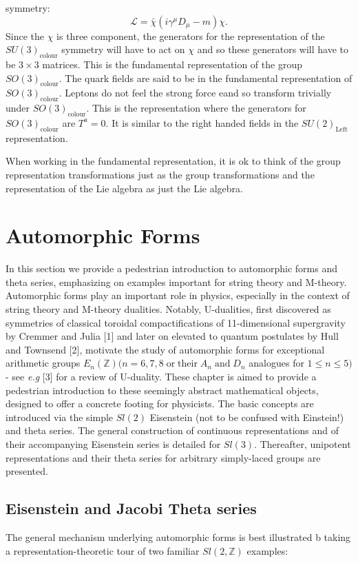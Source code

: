 symmetry:
\begin{equation}
  \mathcal{L} = \bar{\chi}\left(i\gamma^\mu D_\mu -m\right)\chi.
\end{equation}
Since the $\chi$ is three component, the generators for the representation of
the $SU(3)_\mathrm{colour}$ symmetry will have to act on $\chi$ and so these
generators will have to be $3\times 3$ matrices. This is the fundamental
representation
of the group $SO(3)_\mathrm{colour}$. The quark fields are said to be in the
fundamental representation of $SO(3)_\mathrm{colour}$. Leptons do not feel the
strong force eand so transform trivially under $SO(3)_\mathrm{colour}$. This is
the representation where the generators for $SO(3)_\mathrm{colour}$ are
$T^a=0$. It is similar to the right handed fields in the $SU(2)_\mathrm{Left}$
representation.
\par When working in the fundamental representation, it is ok to think of the 
group representation transformations just as the group transformations and the
representation of the Lie algebra as just the Lie algebra.


\section{Automorphic Forms}
In this section we provide a pedestrian introduction to automorphic forms and
theta series, emphasizing on examples important for string theory and M-theory.
Automorphic forms play an important role in physics, especially in the context
of string theory and M-theory dualities. Notably, U-dualities, first discovered
as symmetries of classical toroidal compactifications of 11-dimensional
supergravity by Cremmer and Julia [1] and later on elevated to quantum
postulates by Hull and Townsend [2], motivate the study of automorphic forms
for exceptional arithmetic groups $E_n(\mathbb{Z}) (n=6,7,8\;\mathrm{ or\;
their }\;A_n\;\mathrm{ and }\;D_n$ analogues for $1\leq n\leq 5)$ - see \textit{e.g} [3]
for a review of U-duality. These chapter is aimed to provide a pedestrian
introduction to these seemingly abstract mathematical objects, designed to offer
a concrete footing for physicists. The basic concepts are introduced via the
simple $Sl(2)$ Eisenstein (not to be confused with Einstein!) and theta series.
The general construction of continuous representations and of their
accompanying Eisenstein series is detailed for $Sl(3)$. Thereafter, unipotent
representations and their theta series for arbitrary simply-laced groups are
presented.
\subsection{Eisenstein and Jacobi Theta series}
The general mechanism underlying automorphic forms is best illustrated b taking
a representation-theoretic tour of two familiar $Sl(2,\mathbb{Z})$ examples:
